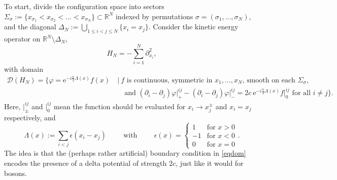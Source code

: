 \documentclass[a4paper,11pt]{article}
\newcommand{\euler}[1]{\text{e}^{#1}}
\newcommand{\R}{\mathbb{R}}
\numberwithin{equation}{section}
\begin{document}
	To start, divide the configuration space into sectors $ \Sigma_\sigma:=\{x_{\sigma_1}<x_{\sigma_2}<\dots<x_{\sigma_N}\}\subset \R^N $ indexed by permutations $ \sigma=(\sigma_1,\dots,\sigma_N) $, and the diagonal 
	$\Delta_N:=\bigcup_{1\leq i<j\leq N}\{x_i=x_j\}$. Consider the kinetic energy operator on $\R^N\setminus\Delta_N$,
	\begin{equation}
		H_N=-\sum_{i=1}^{N}\partial_{x_i}^2,
	\end{equation}
	with domain \begin{equation}
		\label{eqdom}
		\begin{aligned}
			\mathcal{D}(H_N)=\bigg\{\varphi=\euler{-i\frac{\kappa}{2}\Lambda(x)}f(x)&\ \bigg\vert\ f \text{ is continuous, symmetric in $x_1,\dots,x_N$, smooth on each $\Sigma_\sigma$,}\\&\quad \ \text{and } (\partial_i-\partial_j)\varphi\rvert^{ij}_+-(\partial_i-\partial_j)\varphi\rvert^{ij}_-=2c\ \euler{-i\frac{\kappa}{2}\Lambda(x)} f\rvert^{ij}_0 \text{ for all }i\neq j \bigg\}.
		\end{aligned}
	\end{equation}
	Here, $ \vert^{ij}_{\pm} $ and $\vert^{ij}_{0}$ mean the function should be evaluated for $ x_i\to x_j^{\pm}$ and $x_i=x_j$ respectively, and  
	\begin{equation}
		\Lambda(x):= \sum_{i<j}\epsilon(x_i-x_j)\hspace{1cm}\text{with}\hspace{1cm} \epsilon(x)=\begin{cases}
			1&\text{for }x>0\\
			-1&\text{for }x<0\\
			0&\text{for }x=0
		\end{cases}.
	\end{equation} The idea is that the (perhaps rather artificial) boundary condition in \eqref{eqdom} encodes the presence of a delta potential of strength $2c$, just like it would for bosons. 
	
\end{document}
